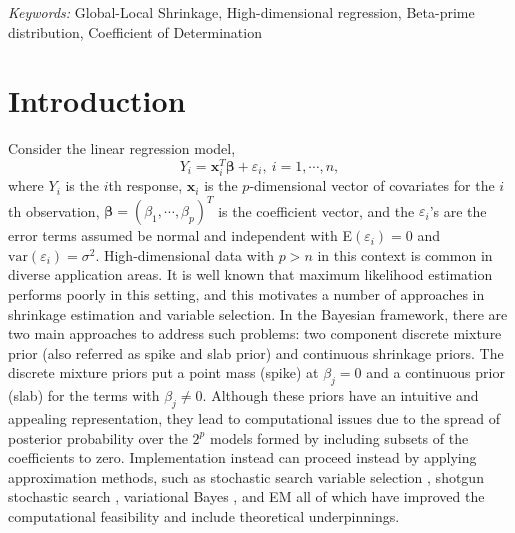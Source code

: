 \documentclass[12pt]{article}
\begin{document}
\noindent%
{\it Keywords:}  Global-Local Shrinkage, High-dimensional regression, Beta-prime distribution,  Coefficient of Determination
\vfill

\newpage
{} %




\clearpage
\section{Introduction}
\label{sec:intro}

Consider the linear regression model,
\begin{equation}
\label{eq_linear_regression}
Y_i=  \bm{x}_i^T \bm{\beta} + \varepsilon_i,   \ i=1,\cdots, n,
\end{equation}
where $Y_i$ is the $i$th response,  $ \bm{x}_i$  is the $p$-dimensional  vector of     covariates for the $i$th observation,  $ \bm\beta=(\beta_{1},\cdots,\beta_p)^T$ is the   coefficient vector, and the  $\varepsilon_i$'s are the error terms assumed be normal and independent with  E$( \varepsilon_i) = 0$ and $\text{var}( \varepsilon_i) = \sigma^2$.
High-dimensional data with $p>n$ in this context   is   common in diverse  application areas.
It is  well known that   maximum likelihood estimation performs poorly in this setting,  and this motivates a number  of approaches in shrinkage estimation and variable selection.    In   the Bayesian framework,   there  are  two  main  approaches to address such problems:   two component discrete mixture prior (also referred as spike and slab prior)  and  continuous shrinkage priors.
%
The  discrete mixture priors  \citep{mitchell1988bayesian, george1993variable,  ishwaran2005spike,  narisetty2014bayesian}   put  a point mass (spike) at $\beta_j=0$ and a continuous prior (slab)  for the terms with $\beta_j\neq0$. Although these priors
have an intuitive and appealing representation, they   lead to computational issues due to  the  spread of posterior probability over the $2^p$ models formed by including subsets of the coefficients to zero.
Implementation instead can proceed instead by applying approximation methods, such as stochastic search variable selection \citep{george1993variable},  shotgun stochastic search \citep{hans2007shotgun}, variational Bayes \citep{ormerod2017vb}, and EM \citep{rovckova2014emvs} all of which have improved the computational feasibility and include theoretical underpinnings.
\end{document}
